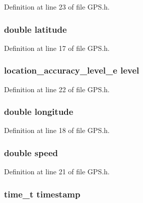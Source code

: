Definition at line 23 of file G\-P\-S.\-h.

\hypertarget{struct__location_a76714bdbc5c536fa77dfb14533ff82a9}{
\subsubsection[{latitude}]{\setlength{\rightskip}{0pt plus 5cm}double latitude}}\label{struct__location_a76714bdbc5c536fa77dfb14533ff82a9}


Definition at line 17 of file G\-P\-S.\-h.

\hypertarget{struct__location_ab42edaa8e596f16b6ff545b9256a4508}{
\subsubsection[{level}]{\setlength{\rightskip}{0pt plus 5cm}location\-\_\-accuracy\-\_\-level\-\_\-e level}}\label{struct__location_ab42edaa8e596f16b6ff545b9256a4508}


Definition at line 22 of file G\-P\-S.\-h.

\hypertarget{struct__location_ac155e35fdeebafc89723a51520fb9fe6}{
\subsubsection[{longitude}]{\setlength{\rightskip}{0pt plus 5cm}double longitude}}\label{struct__location_ac155e35fdeebafc89723a51520fb9fe6}


Definition at line 18 of file G\-P\-S.\-h.

\hypertarget{struct__location_a6dc6e6f3c75c509ce943163afb5dade7}{
\subsubsection[{speed}]{\setlength{\rightskip}{0pt plus 5cm}double speed}}\label{struct__location_a6dc6e6f3c75c509ce943163afb5dade7}


Definition at line 21 of file G\-P\-S.\-h.

\hypertarget{struct__location_a2f48d949c7a1e7bf2ce81c70caa7c3ec}{
\subsubsection[{timestamp}]{\setlength{\rightskip}{0pt plus 5cm}time\-\_\-t timestamp}}\label{struct__location_a2f48d949c7a1e7bf2ce81c70caa7c3ec}


